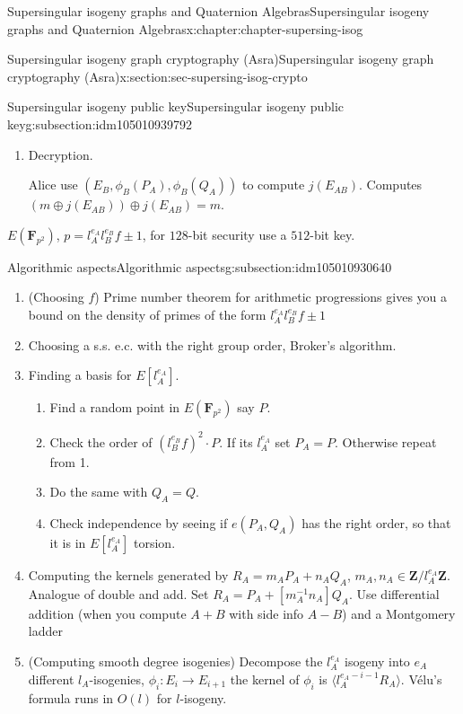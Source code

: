 \documentclass[oneside,10pt,]{book}
\numberwithin{equation}{section}
\newcommand{\inv}{^{-1}}
\newcommand{\lb}{[}
\newcommand{\rb}{]}
\newcommand{\ZZ}{\mathbf{Z}}
\newcommand{\FF}{\mathbf{F}}
\begin{document}
\begin{chapterptx}{Supersingular isogeny graphs and Quaternion Algebras}{}{Supersingular isogeny graphs and Quaternion Algebras}{}{}{x:chapter:chapter-supersing-isog}
\begin{sectionptx}{Supersingular isogeny graph cryptography (Asra)}{}{Supersingular isogeny graph cryptography (Asra)}{}{}{x:section:sec-supersing-isog-crypto}
\begin{subsectionptx}{Supersingular isogeny public key}{}{Supersingular isogeny public key}{}{}{g:subsection:idm105010939792}
\begin{enumerate}
\par
Send Alice \(c = (E_B, \phi_B(P_A), \phi_B(Q_A), m\oplus j(E_{AB}))\)%
\item{}Decryption.%
\par
Alice use \((E_B, \phi_B(P_A), \phi_B(Q_A))\) to compute \(j(E_{AB})\). Computes \((m\oplus j(E_{AB})) \oplus j(E_{AB}) = m\).%
\end{enumerate}
%
\par
\(E(\FF_{p^2})\), \(p = l_A^{e_A} l_B^{e_B} f \pm 1\), for \(128\)-bit security use a \(512\)-bit key.%
\end{subsectionptx}
%
%
\typeout{************************************************}
\typeout{************************************************}
%
\begin{subsectionptx}{Algorithmic aspects}{}{Algorithmic aspects}{}{}{g:subsection:idm105010930640}
%
\begin{enumerate}
\item{}(Choosing \(f\)) Prime number theorem for arithmetic progressions gives you a bound on the density of primes of the form \(l_A^{e_A} l_B^{e_B} f \pm 1\)%
\item{}Choosing a s.s. e.c. with the right group order, Broker's algorithm.%
\item{}Finding a basis for \(E\lb l_A^{e_A}\rb\).%
\begin{enumerate}
\item{}Find a random point in \(E(\FF_{p^2})\) say \(P\).%
\item{}Check the order of \((l_B^{e_B} f)^2 \cdot P\). If its \(l_A^{e_A}\) set \(P_A = P\). Otherwise repeat from 1.%
\item{}Do the same with \(Q_A = Q\).%
\item{}Check independence by seeing if \(e(P_A,Q_A) \) has the right order, so that it is in \(E\lb l_A^{e_A} \rb\) torsion.%
\end{enumerate}
%
\item{}Computing the kernels generated by \(R_A = m_A P_A + n_A Q_A\), \(m_A, n_A \in \ZZ/l_A^{e_A} \ZZ\). Analogue of double and add. Set \(R_A = P_A + \lb m_A\inv n_A\rb Q_A\). Use differential addition (when you compute \(A+B\) with side info \(A-B\)) and a Montgomery ladder%
\item{}(Computing smooth degree isogenies) Decompose the \(l_A^{e_A}\) isogeny into \(e_A\) different \(l_A\)-isogenies, \(\phi_i\colon E_i \to E_{i+1}\) the kernel of \(\phi_i\) is \(\langle l_A^{e_A - i - 1} R_A\rangle\). Vélu's formula runs in \(O(l)\) for \(l\)-isogeny.%

\end{enumerate}
\end{subsectionptx}
\end{sectionptx}
\end{chapterptx}
\end{document}
